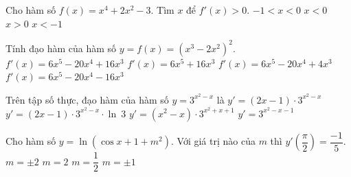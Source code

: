\begin{ex}%
	Cho hàm số $f(x)=x^4+2x^2-3$. Tìm $x$  để $f'(x)>0$.
	 \choice
		{$-1<x<0$} 
		{$x<0$} 
		{\True  $x>0$}
		 {$x<-1$}
\end{ex}

\begin{ex}%
	Tính đạo hàm của hàm số  $y=f(x)=\left(x^3-2x^2\right)^2$.
	\choice 
		 {\True $f'(x)=6x^5-20x^4+16x^3$}
		{$f'(x)=6x^5+16x^3$} 
		{$f'(x)=6x^5-20x^4+4x^3$} 
		 {$f'(x)=6x^5-20x^4-16x^3$}
\end{ex}

\begin{ex}%
	Trên tập số thực, đạo hàm của hàm số $y=3^{x^{2}-x}$  là
	 \choice
		{$y'=(2x-1) \cdot 3^{x^{2}-x}$} 
		{\True $y'=(2x-1) \cdot 3^{x^{2}-x}  \cdot \ln~3$}
		{$y'=(x^{2}-x)  \cdot 3^{x^{2}+x+1}$}
		 {$y'=3^{x^{2}-x-1}$}
\end{ex}

\begin{ex}%
	Cho  hàm số $y=\ln (\cos x+1+m^2)$. Với giá trị nào của $m$ thì $y'\left(\dfrac{\pi}{2} \right)=\dfrac{-1}{5}$.
	\choice 
		{\True $m=\pm  2$}
		 {$m=2$}
		 {$m=\dfrac{1}{2}$}
		{$m=\pm  1$}
\end{ex}

